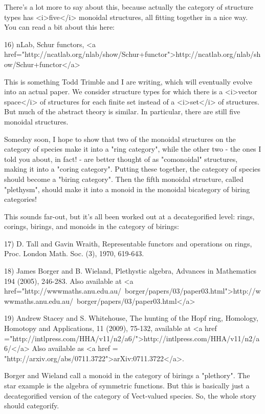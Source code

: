 There's a lot more to say about this, because actually the category of
structure types has <i>five</i> monoidal structures, all fitting
together in a nice way.  You can read a bit about this here:

16) nLab, Schur functors, <a href="http://ncatlab.org/nlab/show/Schur+functor">http://ncatlab.org/nlab/show/Schur+functor</a>

This is something Todd Trimble and I are writing, which will
eventually evolve into an actual paper.  We consider structure types
for which there is a <i>vector space</i> of structures for each finite
set instead of a <i>set</i> of structures.  But much of the abstract
theory is similar.  In particular, there are still five monoidal
structures.

Someday soon, I hope to show that two of the monoidal structures on
the category of species make it into a "ring category", while the
other two - the ones I told you about, in fact! - are better thought
of as "comonoidal" structures, making it into a "coring category".
Putting these together, the category of species should become a
"biring category".  Then the fifth monoidal structure, called
"plethysm", should make it into a monoid in the monoidal bicategory of
biring categories!

This sounds far-out, but it's all been worked out at a decategorified
level: rings, corings, birings, and monoids in the category of
birings:

17) D. Tall and Gavin Wraith, Representable functors and operations on
rings, Proc. London Math. Soc. (3), 1970, 619-643.

18) James Borger and B. Wieland, Plethystic algebra, Advances in
Mathematics 194 (2005), 246-283.  Also available at <a
href="http://wwwmaths.anu.edu.au/~borger/papers/03/paper03.html">http://wwwmaths.anu.edu.au/~borger/papers/03/paper03.html</a>

19) Andrew Stacey and S. Whitehouse, The hunting of the Hopf ring,
Homology, Homotopy and Applications, 11 (2009), 75-132, available at
<a href
="http://intlpress.com/HHA/v11/n2/a6/">http://intlpress.com/HHA/v11/n2/a6/</a>
Also available as <a href =
"http://arxiv.org/abs/0711.3722">arXiv:0711.3722</a>.

Borger and Wieland call a monoid in the category of birings a
"plethory".  The star example is the algebra of symmetric functions.
But this is basically just a decategorified version of the category of
Vect-valued species.  So, the whole story should categorify.

